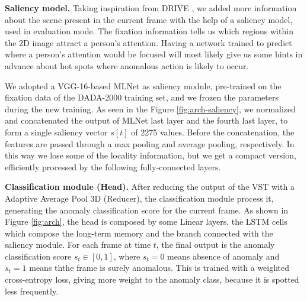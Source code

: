 \noindent\textbf{Saliency model.}
Taking inspiration from DRIVE \cite{bao2021drive}, we added more information about the scene present in the current frame with the help of a saliency model, used in evaluation mode.
The fixation information tells us which regions within the 2D image attract a person's attention.
Having a network trained to predict where a person's attention would be focused will most likely give us some hints in advance about hot spots where anomalous action is likely to occur.

We adopted a VGG-16-based MLNet \cite{cornia2016deep} as saliency module, pre-trained on the fixation data of the DADA-2000 \cite{fang2019dada} training set, and we frozen the parameters during the new training.
As seen in the Figure \ref{fig:arch-saliency}, we normalized and concatenated the output of MLNet last layer and the fourth last layer, to form a single saliency vector $s[t]$ of 2275 values.
Before the concatenation, the features are passed through a max pooling and average pooling, respectively.
In this way we lose some of the locality information, but we get a compact version, efficiently processed by the following fully-connected layers.

\noindent\textbf{Classification module (Head).}
After reducing the output of the VST with a Adaptive Average Pool 3D (Reducer), the classification module process it, generating the anomaly classification score for the current frame.
As shown in Figure \ref{fig:arch}, the head is composed by some Linear layers, the LSTM cells which compose the long-term memory and the branch connected with the saliency module.
For each frame at time $t$, the final output is the anomaly classification score $s_t \in [0,1]$, where $s_t=0$ means absence of anomaly and $s_t=1$ means ththe frame is surely anomalous.
This is trained with a weighted cross-entropy loss, giving more weight to the anomaly class, because it is spotted less frequently. 

